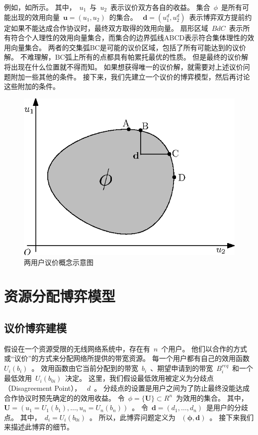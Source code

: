 例如，如所示。
其中，~$u_1$~与~$u_2$~表示议价双方各自的收益。
集合~$\phi$~是所有可能出现的效用向量~$\mathbf{u}=(u_1,u_2)$~的集合。
~$\mathbf{d}=(u_1^d, u_2^d)$~表示博弈双方提前约定如果不能达成合作协议时，最终双方取得的效用向量。
扇形区域~$BdC$~表示所有符合个人理性的效用向量集合，而集合的边界弧线ABCD表示符合集体理性的效用向量集合。
两者的交集弧BC是可能的议价区域，包括了所有可能达到的议价解。
不难理解，BC弧上所有的点都具有帕累托最优的性质。
但是最终的议价解将出现在什么位置就不得而知。
如果想获得唯一的议价解，就需要对上述议价问题附加一些其他的条件。
接下来，我们先建立一个议价的博弈模型，然后再讨论这些附加的条件。
\begin{figure}[!tb] 
    \centering
   \begin{minipage}[t]{0.65\linewidth} 
    \centering 
    \includegraphics[width = \textwidth]{bargain_basic_concept} 
    \caption{两用户议价概念示意图} 
    \label{fig:chap_bargain:bargain_basic_concept} 
  \end{minipage}%
\end{figure}


\section{资源分配博弈模型}
\subsection{议价博弈建模}
假设在一个资源受限的无线网络系统中，存在有~$n$~个用户。
他们以合作的方式或“议价”的方式来分配网络所提供的带宽资源。
每一个用户都有自己的效用函数~$U_i(b_i)$~。
效用函数由它当前分配到的带宽~$b_i$~、期望申请到的带宽~$B_i^{req}$~和一个最低效用~$U_i(b_{0i})$~决定。
这里，我们假设最低效用被定义为分歧点（Disagreement Point）， ~$d$~。 
分歧点的设置是用户之间为了防止最终没能达成合作协议时预先确定的的效用收益。
令~$\phi = \{ \mathbf{U} \} \subset R^n$~为效用的集合。
其中，~$\mathbf{U} =( u_1 =U_1(b_1), \ldots, u_n = U_n(b_n))$~。
令~$\mathbf{d} = (d_1, \ldots, d_n)$~是用户的分歧点。
其中，~$d_i = U_i(b_{0i})$~。
所以，此博弈问题定义为 ~$(\mathbf{\phi,d})$~。
接下来我们来描述此博弈的细节。

